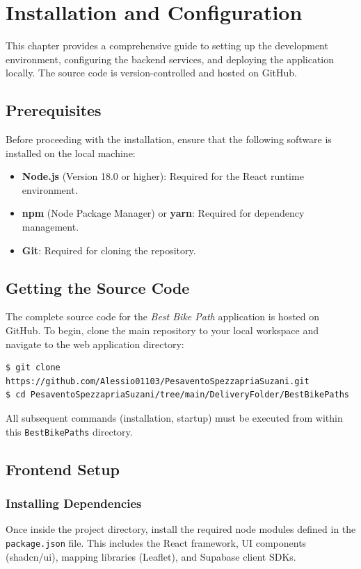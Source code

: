 \section{Installation and Configuration}
\label{chap:installation}

This chapter provides a comprehensive guide to setting up the development environment, configuring the backend services, and deploying the application locally. The source code is version-controlled and hosted on GitHub.

\subsection{Prerequisites}
Before proceeding with the installation, ensure that the following software is installed on the local machine:

\begin{itemize}
    \item \textbf{Node.js} (Version 18.0 or higher): Required for the React runtime environment.
    \item \textbf{npm} (Node Package Manager) or \textbf{yarn}: Required for dependency management.
    \item \textbf{Git}: Required for cloning the repository.
\end{itemize}

\subsection{Getting the Source Code}
The complete source code for the \textit{Best Bike Path} application is hosted on GitHub. To begin, clone the main repository to your local workspace and navigate to the web application directory:

\begin{verbatim}
$ git clone https://github.com/Alessio01103/PesaventoSpezzapriaSuzani.git
$ cd PesaventoSpezzapriaSuzani/tree/main/DeliveryFolder/BestBikePaths
\end{verbatim}

All subsequent commands (installation, startup) must be executed from within this \texttt{BestBikePaths} directory.

\subsection{Frontend Setup}

\subsubsection{Installing Dependencies}
Once inside the project directory, install the required node modules defined in the \texttt{package.json} file. This includes the React framework, UI components (shadcn/ui), mapping libraries (Leaflet), and Supabase client SDKs.

